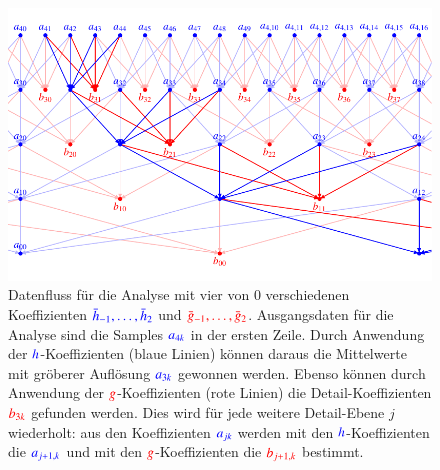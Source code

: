 \begin{figure}
\centering
\includegraphics{chapters/7-algo/images/fastalgo.pdf}
\caption{Datenfluss für die Analyse mit vier von $0$ verschiedenen
Koeffizienten $\color{blue}\bar{h}_{-1},\dots,\bar{h}_2$ und
$\color{red}\bar{g}_{-1},\dots,\bar{g}_2$.
Ausgangsdaten für die Analyse sind die Samples $\color{blue}a_{4k}$
in der ersten Zeile.
Durch Anwendung der $\color{blue}h$-Koeffizienten (blaue Linien) können daraus
die Mittelwerte mit gröberer Auflösung $\color{blue}a_{3k}$ gewonnen werden.
Ebenso können durch Anwendung der $\color{red}g$-Koeffizienten (rote Linien)
die Detail-Koeffizienten $\color{red}b_{3k}$ gefunden werden.
Dies wird für jede weitere Detail-Ebene $j$ wiederholt: aus den Koeffizienten
$\color{blue}a_{jk}$ werden mit den $\color{blue}h$-Koeffizienten die
$\color{blue}a_{j+1,k}$ und mit den $\color{red}g$-Koeffizienten die
$\color{red}b_{j+1,k}$ bestimmt.
\label{algo:image:fastalgo}}
\end{figure}


